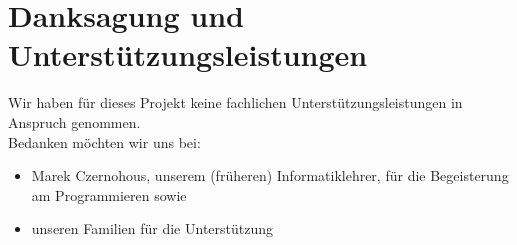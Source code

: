     \chapter{Danksagung und Unterstützungsleistungen}
    Wir haben für dieses Projekt keine fachlichen Unterstützungsleistungen in Anspruch genommen.\\
    Bedanken möchten wir uns bei:
    \begin{itemize}
        \item Marek Czernohous, unserem (früheren) Informatiklehrer, für die Begeisterung am Programmieren sowie
        \item unseren Familien für die Unterstützung
    \end{itemize}